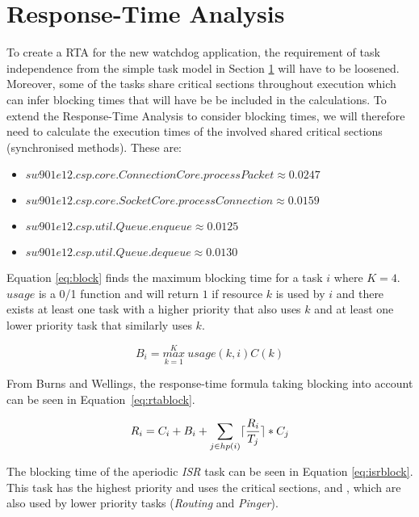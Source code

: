 \section{Response-Time Analysis}
To create a RTA for the new watchdog application, the requirement of task independence from the simple task model in Section \ref{} will have to be loosened. Moreover, some of the tasks share critical sections throughout execution which can infer blocking times that will have be be included in the calculations. To extend the Response-Time Analysis to consider blocking times, we will therefore need to calculate the execution times of the involved shared critical sections (synchronised methods). These are:

\begin{itemize}
	\item $ sw901e12.csp.core.ConnectionCore.processPacket \approx 0.0247$
	\item $ sw901e12.csp.core.SocketCore.processConnection \approx 0.0159$
	\item $ sw901e12.csp.util.Queue.enqueue \approx 0.0125$
	\item $ sw901e12.csp.util.Queue.dequeue \approx 0.0130$
\end{itemize}

Equation \ref{eq:block} finds the maximum blocking time for a task $i$ where $K=4$. $usage$ is a 0/1 function and will return $1$ if resource $k$ is used by $i$ and there exists at least one task with a higher priority that also uses $k$ and at least one lower priority task that similarly uses $k$.

\begin{equation}
\label{eq:block}
     B_{i} = \overset{K}{\underset{k=1}{max}}\ usage(k, i)C(k)
\end{equation}

From Burns and Wellings, the response-time formula taking blocking into account can be seen in Equation~\ref{eq:rtablock}.

\begin{equation}
\label{eq:rtablock}
     R_{i} = C_{i} + B_{i} + \sum\limits_{j\in hp(i)} \lceil\frac{R_{i}}{T_{j}}\rceil*C_{j}
\end{equation}

The blocking time of the aperiodic \textit{ISR} task can be seen in Equation \ref{eq:isrblock}. This task has the highest priority and uses the critical sections,  and , which are also used by lower priority tasks (\textit{Routing} and \textit{Pinger}).

